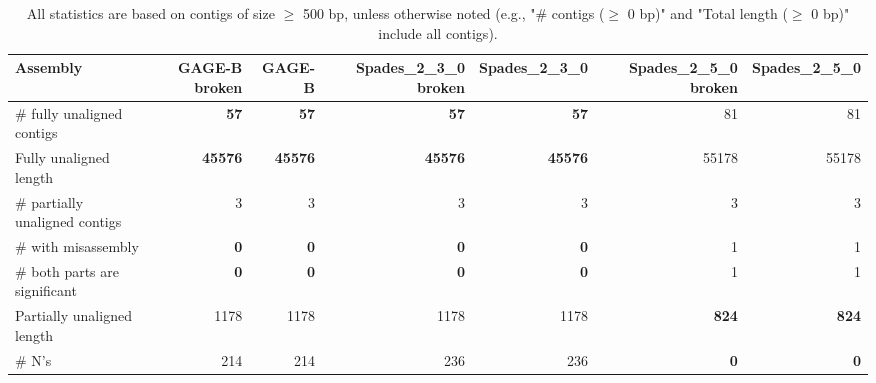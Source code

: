 \documentclass[12pt,a4paper]{article}
\begin{document}
\begin{table}[ht]
\begin{center}
\caption{All statistics are based on contigs of size $\geq$ 500 bp, unless otherwise noted (e.g., "\# contigs ($\geq$ 0 bp)" and "Total length ($\geq$ 0 bp)" include all contigs).}
\begin{tabular}{|l*{6}{|r}|}
\hline
Assembly & GAGE-B broken & GAGE-B & Spades\_2\_3\_0 broken & Spades\_2\_3\_0 & Spades\_2\_5\_0 broken & Spades\_2\_5\_0 \\ \hline
\# fully unaligned contigs & {\bf 57} & {\bf 57} & {\bf 57} & {\bf 57} & 81 & 81 \\ \hline
Fully unaligned length & {\bf 45576} & {\bf 45576} & {\bf 45576} & {\bf 45576} & 55178 & 55178 \\ \hline
\# partially unaligned contigs & 3 & 3 & 3 & 3 & 3 & 3 \\ \hline
\hspace{5mm}\# with misassembly & {\bf 0} & {\bf 0} & {\bf 0} & {\bf 0} & 1 & 1 \\ \hline
\hspace{5mm}\# both parts are significant & {\bf 0} & {\bf 0} & {\bf 0} & {\bf 0} & 1 & 1 \\ \hline
Partially unaligned length & 1178 & 1178 & 1178 & 1178 & {\bf 824} & {\bf 824} \\ \hline
\# N's & 214 & 214 & 236 & 236 & {\bf 0} & {\bf 0} \\ \hline
\end{tabular}
\end{center}
\end{table}
\end{document}
